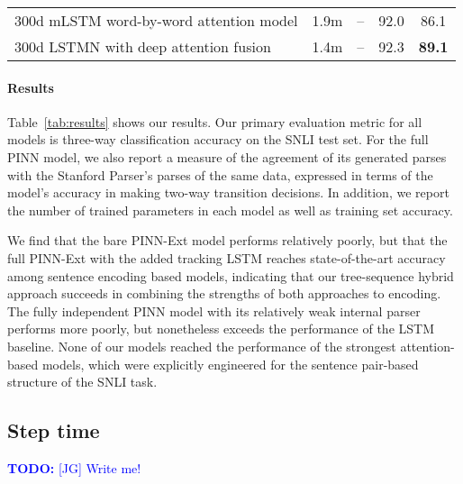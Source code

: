 \documentclass[11pt,letterpaper]{article}
\newcommand\todo[1]{\textcolor{blue}{\textbf{TODO:} #1}}
\begin{document}
\begin{table*}[t]
\begin{tabular}{lcccc}
300d mLSTM word-by-word attention model \cite{DBLP:journals/corr/WangJ15b}
                        & 1.9m               & --             &   92.0   &   86.1      \\
300d LSTMN with deep attention fusion \cite{cheng2016long}
                        & 1.4m               & --                &   92.3   &   \textbf{89.1}      \\
    \bottomrule
  \end{tabular}
  \protect\caption{\protect\label{tab:results}Results on SNLI 3-way inference classification. Params. is the approximate number of trained parameters (excluding word embeddings for models where they are trained). Trans. acc. is the model's accuracy in predicting parsing transitions. Train and test are SNLI classification accuracy. \todo{[SB]: Estimate param counts as numbers come in.}} 
\end{table*}

\paragraph{Results} Table~\ref{tab:results} shows our results. Our primary evaluation metric for all models is three-way classification accuracy on the SNLI test set. For the full PINN model, we also report a measure of the agreement of its generated parses with the Stanford Parser's parses of the same data, expressed in terms of the model's accuracy in making two-way transition decisions. In addition, we report the number of trained parameters in each model as well as training set accuracy.

We find that the bare PINN-Ext model performs relatively poorly, but that the full PINN-Ext with the added tracking LSTM reaches state-of-the-art accuracy among sentence encoding based models, indicating that our tree-sequence hybrid approach succeeds in combining the strengths of both approaches to encoding. The fully independent PINN model with its relatively weak internal parser performs more poorly, but nonetheless exceeds the performance of the LSTM baseline. None of our models reached the performance of the strongest attention-based models, which were explicitly engineered for the sentence pair-based structure of the SNLI task.

\subsection{Step time}

\todo{[JG] Write me!}
\end{document}
